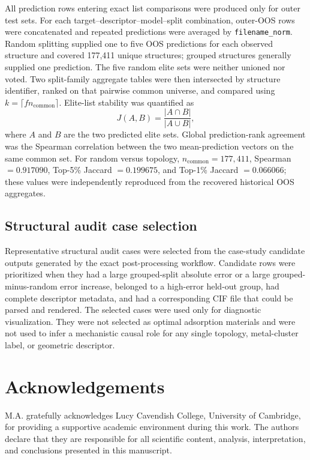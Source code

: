 \documentclass[11pt,a4paper]{article}
\begin{document}
All prediction rows entering exact list comparisons were produced only for outer test sets. For each target--descriptor--model--split combination, outer-OOS rows were concatenated and repeated predictions were averaged by \texttt{filename\_norm}. Random splitting supplied one to five OOS predictions for each observed structure and covered 177,411 unique structures; grouped structures generally supplied one prediction. The five random elite sets were neither unioned nor voted. Two split-family aggregate tables were then intersected by structure identifier, ranked on that pairwise common universe, and compared using $k=\lceil f n_{\mathrm{common}}\rceil$. Elite-list stability was quantified as
\[
J(A,B)=\frac{|A\cap B|}{|A\cup B|},
\]
where $A$ and $B$ are the two predicted elite sets. Global prediction-rank agreement was the Spearman correlation between the two mean-prediction vectors on the same common set. For random versus topology, $n_{\mathrm{common}}=177{,}411$, Spearman $=0.917090$, Top-5\% Jaccard $=0.199675$, and Top-1\% Jaccard $=0.066066$; these values were independently reproduced from the recovered historical OOS aggregates. 

\subsection*{Structural audit case selection}
Representative structural audit cases were selected from the case-study candidate outputs generated by the exact post-processing workflow. Candidate rows were prioritized when they had a large grouped-split absolute error or a large grouped-minus-random error increase, belonged to a high-error held-out group, had complete descriptor metadata, and had a corresponding CIF file that could be parsed and rendered. The selected cases were used only for diagnostic visualization. They were not selected as optimal adsorption materials and were not used to infer a mechanistic causal role for any single topology, metal-cluster label, or geometric descriptor.


\section*{Acknowledgements}
M.A. gratefully acknowledges Lucy Cavendish College, University of Cambridge, for providing a supportive academic environment during this work. The authors declare that they are responsible for all scientific content, analysis, interpretation, and conclusions presented in this manuscript.
\end{document}

